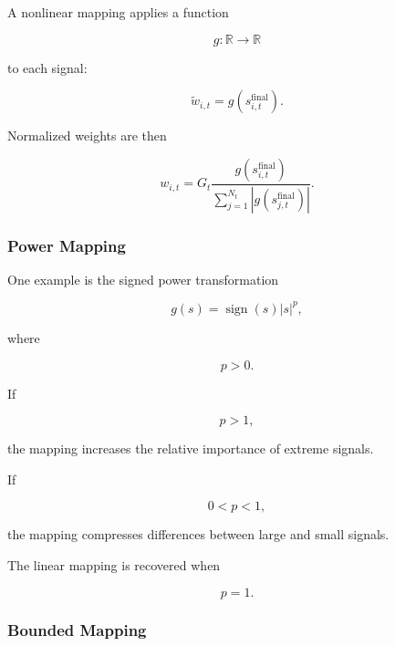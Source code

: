 \documentclass[11pt,a4paper]{article}
\begin{document}
A nonlinear mapping applies a function

\begin{equation}
g:\mathbb{R}\rightarrow\mathbb{R}
\end{equation}

to each signal:

\begin{equation}
\boxed{
\widetilde{w}_{i,t}
=
g
\left(
s_{i,t}^{\mathrm{final}}
\right).
}
\end{equation}

Normalized weights are then

\begin{equation}
\boxed{
w_{i,t}
=
G_t
\frac{
g(s_{i,t}^{\mathrm{final}})
}{
\sum_{j=1}^{N_t}
|g(s_{j,t}^{\mathrm{final}})|
}.
}
\end{equation}


\subsubsection{Power Mapping}

One example is the signed power transformation

\begin{equation}
\boxed{
g(s)
=
\operatorname{sign}(s)
|s|^{p},
}
\end{equation}

where

\begin{equation}
p>0.
\end{equation}

If

\begin{equation}
p>1,
\end{equation}

the mapping increases the relative importance of extreme signals.

If

\begin{equation}
0<p<1,
\end{equation}

the mapping compresses differences between large and small signals.

The linear mapping is recovered when

\begin{equation}
p=1.
\end{equation}


\subsubsection{Bounded Mapping}
\end{document}
